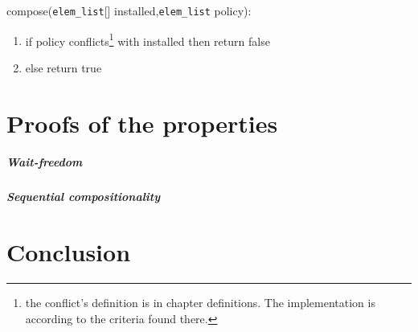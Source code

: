\documentclass{article}
\begin{document}
compose(\texttt{elem\_list}[] installed,\texttt{elem\_list} policy):
\begin{enumerate}
\item if policy conflicts\footnote{the conflict's definition is in chapter definitions. The implementation is according to the criteria found there.} with installed then return false
\item else return true
\end{enumerate} 
\section{Proofs of the properties}
\subparagraph{Wait-freedom}
\subparagraph{Sequential compositionality}
%
%
\section{Conclusion}


\end{document}
